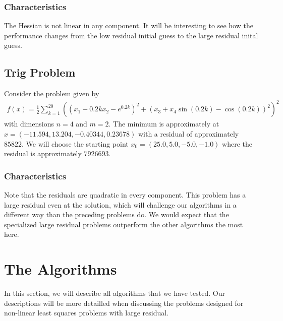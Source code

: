 \documentclass{article}
\theoremstyle{plain}%
\theoremstyle{definition}
\begin{document}
\subsubsection{Characteristics}
The Hessian is not linear in any component. It will be interesting
to see how the performance changes from the low residual initial guess to the large
residual inital guess. 
\subsection{Trig Problem}
Consider the problem given by 
\begin{align*}
  f(x)=\frac{1}{2}\sum_{k=1}^{20} \left(\left(x_1-0.2kx_2-e^{0.2k} \right)^2+\left(x_3+x_4\sin(0.2k)-\cos(0.2k)\right)^2 \right )^2
\end{align*}
with dimensions $n=4$ and $m=2$. The minimum is approximately at $x=(-11.594,13.204,-0.40344,0.23678)$ with a residual of approximately $85822$. We will choose the starting point $x_0=(25.0,5.0,-5.0,-1.0)$ where the residual is approximately $7926693$.
\subsubsection{Characteristics}
Note that the residuals are quadratic in every component. This problem has a large residual even
at the solution, which will challenge our algorithms in a  different way than the preceding problems
do. We would expect that the specialized large residual problems outperform the other algorithms
the most here.
\section{The Algorithms}
In this section, we will describe all algorithms that we have tested. Our descriptions will
be more detailled when discussing the problems designed for non-linear least squares problems
with large residual.
\end{document}
